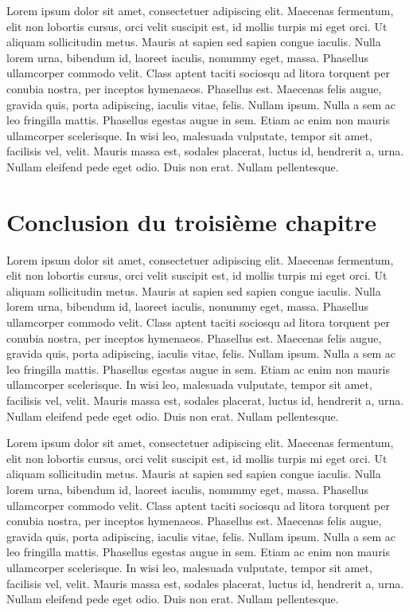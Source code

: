 Lorem ipsum dolor sit amet, consectetuer adipiscing elit. Maecenas fermentum, elit non lobortis cursus, orci velit suscipit est, id mollis turpis mi eget orci. Ut aliquam sollicitudin metus. Mauris at sapien sed sapien congue iaculis. Nulla lorem urna, bibendum id, laoreet iaculis, nonummy eget, massa. Phasellus ullamcorper commodo velit. Class aptent taciti sociosqu ad litora torquent per conubia nostra, per inceptos hymenaeos. Phasellus est. Maecenas felis augue, gravida quis, porta adipiscing, iaculis vitae, felis. Nullam ipsum. Nulla a sem ac leo fringilla mattis. Phasellus egestas augue in sem. Etiam ac enim non mauris ullamcorper scelerisque. In wisi leo, malesuada vulputate, tempor sit amet, facilisis vel, velit. Mauris massa est, sodales placerat, luctus id, hendrerit a, urna. Nullam eleifend pede eget odio. Duis non erat. Nullam pellentesque.

\section{Conclusion du troisième chapitre}


Lorem ipsum dolor sit amet, consectetuer adipiscing elit. Maecenas fermentum, elit non lobortis cursus, orci velit suscipit est, id mollis turpis mi eget orci. Ut aliquam sollicitudin metus. Mauris at sapien sed sapien congue iaculis. Nulla lorem urna, bibendum id, laoreet iaculis, nonummy eget, massa. Phasellus ullamcorper commodo velit. Class aptent taciti sociosqu ad litora torquent per conubia nostra, per inceptos hymenaeos. Phasellus est. Maecenas felis augue, gravida quis, porta adipiscing, iaculis vitae, felis. Nullam ipsum. Nulla a sem ac leo fringilla mattis. Phasellus egestas augue in sem. Etiam ac enim non mauris ullamcorper scelerisque. In wisi leo, malesuada vulputate, tempor sit amet, facilisis vel, velit. Mauris massa est, sodales placerat, luctus id, hendrerit a, urna. Nullam eleifend pede eget odio. Duis non erat. Nullam pellentesque.

Lorem ipsum dolor sit amet, consectetuer adipiscing elit. Maecenas fermentum, elit non lobortis cursus, orci velit suscipit est, id mollis turpis mi eget orci. Ut aliquam sollicitudin metus. Mauris at sapien sed sapien congue iaculis. Nulla lorem urna, bibendum id, laoreet iaculis, nonummy eget, massa. Phasellus ullamcorper commodo velit. Class aptent taciti sociosqu ad litora torquent per conubia nostra, per inceptos hymenaeos. Phasellus est. Maecenas felis augue, gravida quis, porta adipiscing, iaculis vitae, felis. Nullam ipsum. Nulla a sem ac leo fringilla mattis. Phasellus egestas augue in sem. Etiam ac enim non mauris ullamcorper scelerisque. In wisi leo, malesuada vulputate, tempor sit amet, facilisis vel, velit. Mauris massa est, sodales placerat, luctus id, hendrerit a, urna. Nullam eleifend pede eget odio. Duis non erat. Nullam pellentesque.
